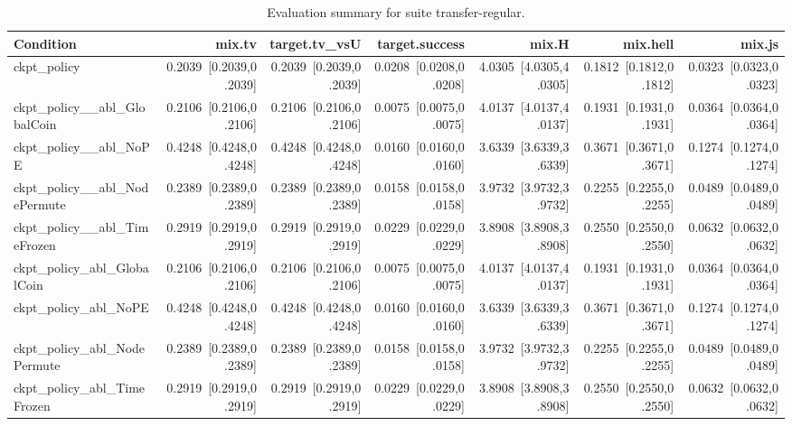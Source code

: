 \begin{table}[t]
\centering
\caption{Evaluation summary for suite transfer-regular.}
\label{tab:eval_transfer-regular}
\begin{tabular}{lrrrrrr}
\toprule
Condition & mix.tv & target.tv\_vsU & target.success & mix.H & mix.hell & mix.js \\
\midrule
ckpt\_policy & 0.2039~[0.2039,0.2039] & 0.2039~[0.2039,0.2039] & 0.0208~[0.0208,0.0208] & 4.0305~[4.0305,4.0305] & 0.1812~[0.1812,0.1812] & 0.0323~[0.0323,0.0323] \\
ckpt\_policy\_\_abl\_GlobalCoin & 0.2106~[0.2106,0.2106] & 0.2106~[0.2106,0.2106] & 0.0075~[0.0075,0.0075] & 4.0137~[4.0137,4.0137] & 0.1931~[0.1931,0.1931] & 0.0364~[0.0364,0.0364] \\
ckpt\_policy\_\_abl\_NoPE & 0.4248~[0.4248,0.4248] & 0.4248~[0.4248,0.4248] & 0.0160~[0.0160,0.0160] & 3.6339~[3.6339,3.6339] & 0.3671~[0.3671,0.3671] & 0.1274~[0.1274,0.1274] \\
ckpt\_policy\_\_abl\_NodePermute & 0.2389~[0.2389,0.2389] & 0.2389~[0.2389,0.2389] & 0.0158~[0.0158,0.0158] & 3.9732~[3.9732,3.9732] & 0.2255~[0.2255,0.2255] & 0.0489~[0.0489,0.0489] \\
ckpt\_policy\_\_abl\_TimeFrozen & 0.2919~[0.2919,0.2919] & 0.2919~[0.2919,0.2919] & 0.0229~[0.0229,0.0229] & 3.8908~[3.8908,3.8908] & 0.2550~[0.2550,0.2550] & 0.0632~[0.0632,0.0632] \\
ckpt\_policy\_abl\_GlobalCoin & 0.2106~[0.2106,0.2106] & 0.2106~[0.2106,0.2106] & 0.0075~[0.0075,0.0075] & 4.0137~[4.0137,4.0137] & 0.1931~[0.1931,0.1931] & 0.0364~[0.0364,0.0364] \\
ckpt\_policy\_abl\_NoPE & 0.4248~[0.4248,0.4248] & 0.4248~[0.4248,0.4248] & 0.0160~[0.0160,0.0160] & 3.6339~[3.6339,3.6339] & 0.3671~[0.3671,0.3671] & 0.1274~[0.1274,0.1274] \\
ckpt\_policy\_abl\_NodePermute & 0.2389~[0.2389,0.2389] & 0.2389~[0.2389,0.2389] & 0.0158~[0.0158,0.0158] & 3.9732~[3.9732,3.9732] & 0.2255~[0.2255,0.2255] & 0.0489~[0.0489,0.0489] \\
ckpt\_policy\_abl\_TimeFrozen & 0.2919~[0.2919,0.2919] & 0.2919~[0.2919,0.2919] & 0.0229~[0.0229,0.0229] & 3.8908~[3.8908,3.8908] & 0.2550~[0.2550,0.2550] & 0.0632~[0.0632,0.0632] \\
\bottomrule
\end{tabular}
\end{table}
